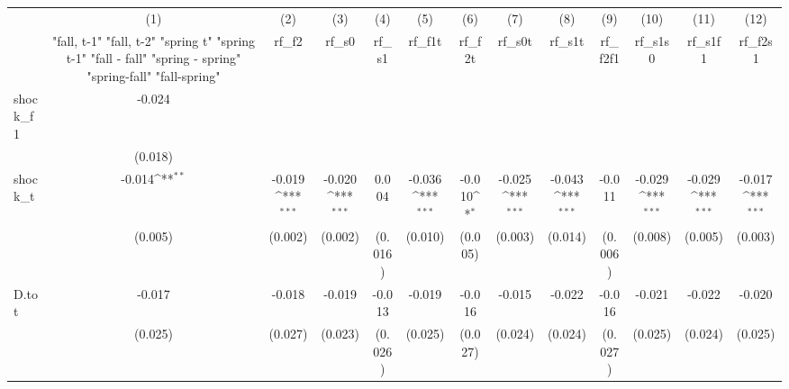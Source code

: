 {
\def\sym#1{\ifmmode^{#1}\else\(^{#1}\)\fi}
\begin{tabular}{l*{12}{c}}
\toprule
            &\multicolumn{1}{c}{(1)}&\multicolumn{1}{c}{(2)}&\multicolumn{1}{c}{(3)}&\multicolumn{1}{c}{(4)}&\multicolumn{1}{c}{(5)}&\multicolumn{1}{c}{(6)}&\multicolumn{1}{c}{(7)}&\multicolumn{1}{c}{(8)}&\multicolumn{1}{c}{(9)}&\multicolumn{1}{c}{(10)}&\multicolumn{1}{c}{(11)}&\multicolumn{1}{c}{(12)}\\
            &\multicolumn{1}{c}{  "fall, t-1" "fall, t-2" "spring t" "spring t-1"  "fall - fall" "spring - spring" "spring-fall" "fall-spring" }&\multicolumn{1}{c}{rf\_f2}&\multicolumn{1}{c}{rf\_s0}&\multicolumn{1}{c}{rf\_s1}&\multicolumn{1}{c}{rf\_f1t}&\multicolumn{1}{c}{rf\_f2t}&\multicolumn{1}{c}{rf\_s0t}&\multicolumn{1}{c}{rf\_s1t}&\multicolumn{1}{c}{rf\_f2f1}&\multicolumn{1}{c}{rf\_s1s0}&\multicolumn{1}{c}{rf\_s1f1}&\multicolumn{1}{c}{rf\_f2s1}\\
\midrule
shock\_f1    &      -0.024         &                     &                     &                     &                     &                     &                     &                     &                     &                     &                     &                     \\
            &     (0.018)         &                     &                     &                     &                     &                     &                     &                     &                     &                     &                     &                     \\
\addlinespace
shock\_t     &      -0.014\sym{**} &      -0.019\sym{***}&      -0.020\sym{***}&       0.004         &      -0.036\sym{***}&      -0.010\sym{*}  &      -0.025\sym{***}&      -0.043\sym{***}&      -0.011         &      -0.029\sym{***}&      -0.029\sym{***}&      -0.017\sym{***}\\
            &     (0.005)         &     (0.002)         &     (0.002)         &     (0.016)         &     (0.010)         &     (0.005)         &     (0.003)         &     (0.014)         &     (0.006)         &     (0.008)         &     (0.005)         &     (0.003)         \\
\addlinespace
D.tot       &      -0.017         &      -0.018         &      -0.019         &      -0.013         &      -0.019         &      -0.016         &      -0.015         &      -0.022         &      -0.016         &      -0.021         &      -0.022         &      -0.020         \\
            &     (0.025)         &     (0.027)         &     (0.023)         &     (0.026)         &     (0.025)         &     (0.027)         &     (0.024)         &     (0.024)         &     (0.027)         &     (0.025)         &     (0.024)         &     (0.025)         \\

\end{tabular}}
